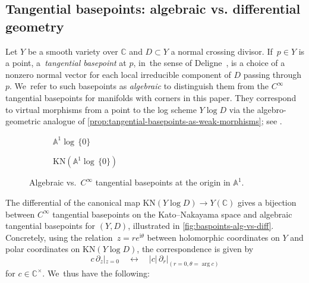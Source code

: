 \documentclass[JEP,XML,SOM,Unicode,NoFloatCountersInSection,published]{cedram}
\theoremstyle{definition}
\theoremstyle{remark}
\let\defn\emph
\newcommand{\CC}{\mathbb{C}}
\newcommand{\AF}{\mathbb{A}}
\newcommand{\logcyl}{\AF^1 \log\, \{0\}}
\newcommand{\iu}{\mathrm{i}}
\newcommand{\cvf}[1]{\partial_{#1}}
\newcommand{\KN}[1]{\mathrm{KN}(#1)}
\begin{document}
\subsection{Tangential basepoints: algebraic vs. differential geometry}
\label{sec:KN-basepoints}
Let $Y$ be a smooth variety over $\CC$ and $D \subset Y$ a normal crossing divisor. If~$p \in Y$ is a point, a~\defn{tangential basepoint} at $p$, in~the sense of Deligne~\cite[\S15]{Deligne1989}, is a choice of a nonzero normal vector for each local irreducible component of $D$ passing through $p$. We~refer to such basepoints as \defn{algebraic} to distinguish them from the $C^\infty$ tangential basepoints for manifolds with corners in this paper. They correspond to virtual morphisms from a point to the log scheme $Y\log D$ via the algebro-geometric analogue of \autoref{prop:tangential-basepoints-as-weak-morphisms}; see \cite{DPP:WeakMorphisms}.

\begin{figure}
\begin{subfigure}{0.4\textwidth}
\centering{}
\caption{$\logcyl$}
\end{subfigure}
\begin{subfigure}{0.4\textwidth}
\centering{}
\caption{$\KN{\logcyl}$}
\end{subfigure}
\caption{Algebraic vs.~$C^\infty$ tangential basepoints at the origin in $\AF^1$.}
\label{fig:baspoints-alg-vs-diff}
\end{figure}

The differential of the canonical map $\KN{Y\log D} \to Y(\CC)$ gives a bijection between $C^\infty$ tangential basepoints on the Kato--Nakayama space and algebraic tangential basepoints for $(Y,D)$, illustrated in \autoref{fig:baspoints-alg-vs-diff}. Concretely, using the relation~\hbox{$z \!=\! r e^{\iu \theta}$} between holomorphic coordinates on $Y$ and polar coordinates on $\KN{Y\log D}$, the correspondence is given by
\[
c\, \cvf{z}|_{z=0} \quad \longleftrightarrow \quad |c| \, \cvf{r}|_{(r=0,\theta=\arg c)}
\]
for $c\in \CC^\times$. We~thus have the following:
\end{document}
